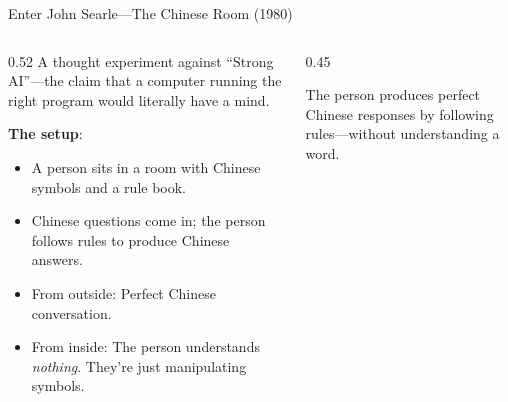 \documentclass[aspectratio=169,11pt]{beamer}
\begin{document}
\begin{frame}{Enter John Searle---The Chinese Room (1980)}
\begin{columns}[T]
\begin{column}{0.52\textwidth}
A thought experiment against ``Strong AI''---the claim that a computer running the right program would literally have a mind.

\vspace{0.3em}
\textbf{The setup}:
\begin{itemize}
    \item A person sits in a room with Chinese symbols and a rule book.
    \item Chinese questions come in; the person follows rules to produce Chinese answers.
    \item From outside: Perfect Chinese conversation.
    \item From inside: The person understands \emph{nothing}. They're just manipulating symbols.
\end{itemize}
\end{column}
\begin{column}{0.45\textwidth}
\begin{center}
\end{center}

\vspace{0.2em}
{\scriptsize The person produces perfect Chinese responses by following rules---without understanding a word.}
\end{column}
\end{columns}
\end{frame}
\end{document}
